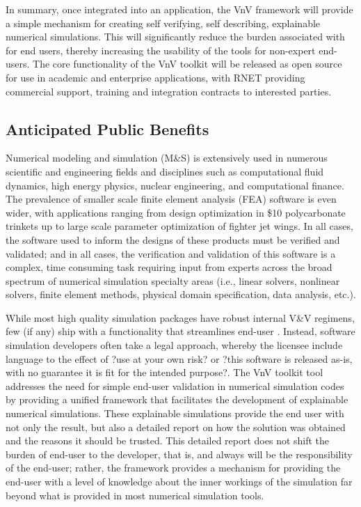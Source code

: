 In summary, once integrated into an application, the VnV framework will provide a simple mechanism for creating self verifying, self describing, explainable numerical simulations. This will significantly reduce the burden associated with \VV for end users, thereby increasing the usability of the tools for non-expert end-users. The core functionality of the VnV toolkit will be released as open source for use in academic and enterprise applications, with RNET providing commercial support, training and integration contracts to interested parties.

\subsection{Anticipated Public Benefits}
Numerical modeling and simulation (M\&S) is extensively used in numerous scientific and engineering fields and disciplines such as computational fluid dynamics, high energy physics, nuclear engineering, and computational finance. The prevalence of smaller scale finite element analysis (FEA) software is even wider, with applications ranging from design optimization in \$10 polycarbonate trinkets up to large scale parameter optimization of fighter jet wings. In all cases, the software used to inform the designs of these products must be verified and validated; and in all cases, the verification and validation of this software is a complex, time consuming task requiring input from experts across the broad spectrum of numerical simulation specialty areas (i.e., linear solvers, nonlinear solvers, finite element methods, physical domain specification, data analysis, etc.). 

While most high quality simulation packages have robust internal V\&V regimens, few (if any) ship with a functionality that streamlines end-user \VV. Instead, software simulation developers often take a legal approach, whereby the licensee include language to the effect of ?use at your own risk? or ?this software is released as-is, with no guarantee it is fit for the intended purpose?. The VnV toolkit tool addresses the need for simple end-user validation in numerical simulation codes by providing a unified framework that facilitates the development of explainable numerical simulations. These explainable simulations provide the end user with not only the result, but also a detailed report on how the solution was obtained and the reasons it should be trusted. This detailed report does not shift the burden of end-user \VV to the developer, that is, and always will be the responsibility of the end-user; rather, the framework provides a mechanism for providing the end-user with a level of knowledge about the inner workings of the simulation far beyond what is provided in most numerical simulation tools. 

